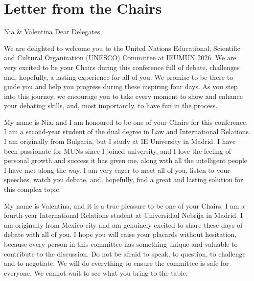 \section{Letter from the Chairs}

\begin{chairletter}{Nia \& Valentina}
Dear Delegates,

We are delighted to welcome you to the United Nations Educational, Scientific and Cultural Organization (UNESCO) Committee at IEUMUN 2026. We are very excited to be your Chairs during this conference full of debate, challenges and, hopefully, a lasting experience for all of you. We promise to be there to guide you and help you progress during these inspiring four days. As you step into this journey, we encourage you to take every moment to show and enhance your debating skills, and, most importantly, to have fun in the process.

My name is Nia, and I am honoured to be one of your Chairs for this conference. I am a second-year student of the dual degree in Law and International Relations. I am originally from Bulgaria, but I study at IE University in Madrid. I have been passionate for MUNs since I joined university, and I love the feeling of personal growth and success it has given me, along with all the intelligent people I have met along the way. I am very eager to meet all of you, listen to your speeches, watch you debate, and, hopefully, find a great and lasting solution for this complex topic.

My name is Valentina, and it is a true pleasure to be one of your Chairs. I am a fourth-year International Relations student at Universidad Nebrija in Madrid.  I am originally from Mexico city and am genuinely excited to share these days of debate with all of you. I hope you will raise your placards without hesitation, because every person in this committee has something unique and valuable to contribute to the discussion. Do not be afraid to speak, to question, to challenge and to negotiate. We will do everything to ensure the committee is safe for everyone. We cannot wait to see what you bring to the table.

\end{chairletter}
